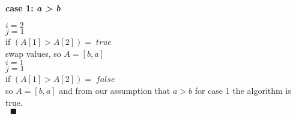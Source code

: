  \\

\begin{minipage}{0.95\textwidth}
\textbf{case 1: \emph{a > b}}
\begin{center}

	$i = 2$ \\
	$j = 1$ \\
	if  $(A[1] > A[2]) = \;true$ \\
	swap values, so $A = [b,a]$ \\
	$i = 1$ \\
	$j = 1$ \\
	if $(A[1] > A[2]) = \;false$ \\
	so $A = [b,a]$ and from our assumption that $a > b$ for case 1 the algorithm is true. \\
	$\;\; \blacksquare$
\end{center}
\end{minipage}






